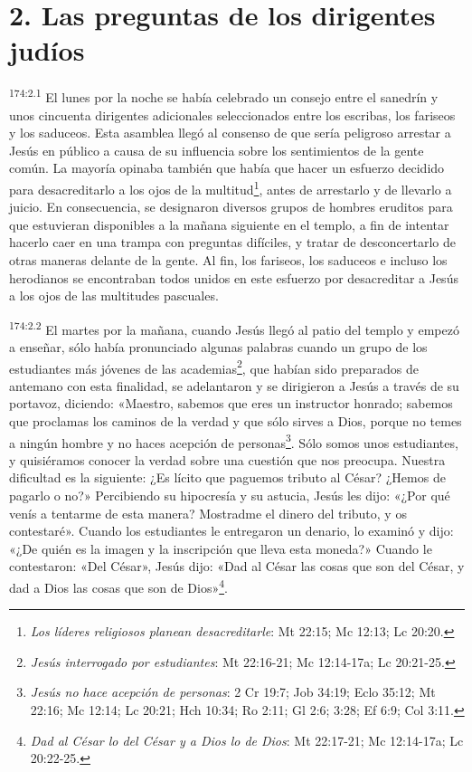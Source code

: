 \section*{2. Las preguntas de los dirigentes judíos}
\par
\textsuperscript{174:2.1} El lunes por la noche se había celebrado un consejo entre el sanedrín y unos cincuenta dirigentes adicionales seleccionados entre los escribas, los fariseos y los saduceos. Esta asamblea llegó al consenso de que sería peligroso arrestar a Jesús en público a causa de su influencia sobre los sentimientos de la gente común. La mayoría opinaba también que había que hacer un esfuerzo decidido para desacreditarlo a los ojos de la multitud\footnote{\textit{Los líderes religiosos planean desacreditarle}: Mt 22:15; Mc 12:13; Lc 20:20.}, antes de arrestarlo y de llevarlo a juicio. En consecuencia, se designaron diversos grupos de hombres eruditos para que estuvieran disponibles a la mañana siguiente en el templo, a fin de intentar hacerlo caer en una trampa con preguntas difíciles, y tratar de desconcertarlo de otras maneras delante de la gente. Al fin, los fariseos, los saduceos e incluso los herodianos se encontraban todos unidos en este esfuerzo por desacreditar a Jesús a los ojos de las multitudes pascuales.

\par
\textsuperscript{174:2.2} El martes por la mañana, cuando Jesús llegó al patio del templo y empezó a enseñar, sólo había pronunciado algunas palabras cuando un grupo de los estudiantes más jóvenes de las academias\footnote{\textit{Jesús interrogado por estudiantes}: Mt 22:16-21; Mc 12:14-17a; Lc 20:21-25.}, que habían sido preparados de antemano con esta finalidad, se adelantaron y se dirigieron a Jesús a través de su portavoz, diciendo: «Maestro, sabemos que eres un instructor honrado; sabemos que proclamas los caminos de la verdad y que sólo sirves a Dios, porque no temes a ningún hombre y no haces acepción de personas\footnote{\textit{Jesús no hace acepción de personas}: 2 Cr 19:7; Job 34:19; Eclo 35:12; Mt 22:16; Mc 12:14; Lc 20:21; Hch 10:34; Ro 2:11; Gl 2:6; 3:28; Ef 6:9; Col 3:11.}. Sólo somos unos estudiantes, y quisiéramos conocer la verdad sobre una cuestión que nos preocupa. Nuestra dificultad es la siguiente: ¿Es lícito que paguemos tributo al César? ¿Hemos de pagarlo o no?» Percibiendo su hipocresía y su astucia, Jesús les dijo: «¿Por qué venís a tentarme de esta manera? Mostradme el dinero del tributo, y os contestaré». Cuando los estudiantes le entregaron un denario, lo examinó y dijo: «¿De quién es la imagen y la inscripción que lleva esta moneda?» Cuando le contestaron: «Del César», Jesús dijo: «Dad al César las cosas que son del César, y dad a Dios las cosas que son de Dios»\footnote{\textit{Dad al César lo del César y a Dios lo de Dios}: Mt 22:17-21; Mc 12:14-17a; Lc 20:22-25.}.

